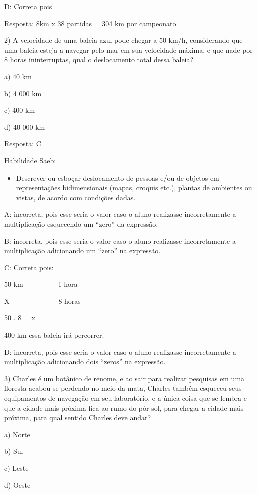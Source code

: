 {D: Correta pois

Resposta: 8km x 38 partidas = 304 km por campeonato

2) A velocidade de uma baleia azul pode chegar a 50 km/h, considerando
que uma baleia esteja a navegar pelo mar em sua velocidade máxima, e que
nade por 8 horas ininterruptas, qual o deslocamento total dessa baleia?

a) 40 km

b) 4 000 km

c) 400 km

d) 40 000 km

Resposta: C

Habilidade Saeb:

\begin{itemize}
\tightlist
\item
  Descrever ou esboçar deslocamento de pessoas e/ou de objetos em
  representações bidimensionais (mapas, croquis etc.), plantas de
  ambientes ou vistas, de acordo com condições dadas.
\end{itemize}

A: incorreta, pois esse seria o valor caso o aluno realizasse
incorretamente a multiplicação esquecendo um ``zero'' da expressão.

B: incorreta, pois esse seria o valor caso o aluno realizasse
incorretamente a multiplicação adicionando um ``zero'' na expressão.

C: Correta pois:

50 km -\/-\/-\/-\/-\/-\/-\/-\/-\/-\/-\/-\/- 1 hora

X -\/-\/-\/-\/-\/-\/-\/-\/-\/-\/-\/-\/-\/-\/-\/-\/-\/-\/- 8 horas

50 . 8 = x

400 km essa baleia irá percorrer.

D: incorreta, pois esse seria o valor caso o aluno realizasse
incorretamente a multiplicação adicionando dois ``zeros'' na expressão.

3) Charles é um botânico de renome, e ao sair para realizar pesquisas em
uma floresta acabou se perdendo no meio da mata, Charles também esqueceu
seus equipamentos de navegação em seu laboratório, e a única coisa que
se lembra e que a cidade mais próxima fica ao rumo do pôr sol, para
chegar a cidade mais próxima, para qual sentido Charles deve andar?

a) Norte

b) Sul

c) Leste

d) Oeste

}
